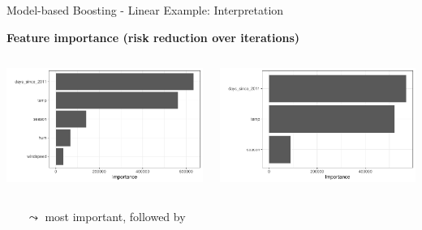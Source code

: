 \documentclass[11pt,compress,t,notes=noshow, aspectratio=169, xcolor=table]{beamer}
\begin{document}
\begin{frame}{Model-based Boosting - Linear Example: Interpretation}

\medskip
\textbf{Feature importance (risk reduction over iterations)}

\medskip

\begin{columns}[T]
\begin{column}{0.47\textwidth}
\includegraphics[width = \textwidth]{figure/compboost_pfi_base2.pdf}
\end{column}


\begin{column}{0.47\textwidth}
\includegraphics[width = \textwidth]{figure/compboost_pfi_base1.pdf}
\end{column}
\end{columns}

\bigskip

\begin{itemize}
    \item[$\leadsto$]  most important, followed by 
\end{itemize}

\end{frame}
\end{document}
